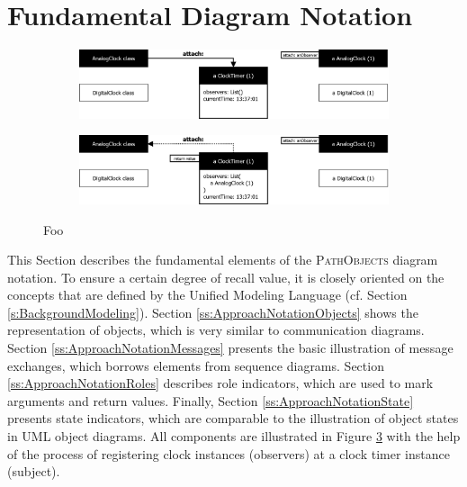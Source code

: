 \section{Fundamental Diagram Notation}
\label{s:ApproachNotation}

\begin{figure}[tb]
	\centering
	
	\begin{subfigure}[b]{1.0\textwidth}
		\centering
        \includegraphics[width=\textwidth]{../images/03-PathObjects-Before}
        \caption[Foo]{}
		\label{fig:ApproachBasicBefore}
	\end{subfigure}
	
	\vspace{1.0cm}
	
	\begin{subfigure}[b]{1.0\textwidth}
		\centering
		\includegraphics[width=\textwidth]{../images/03-PathObjects-After}
		\caption[Foo]{}
		\label{fig:ApproachBasicAfter}
	\end{subfigure}
	
	\caption[Foo]{Foo}
	\label{fig:ApproachBasic}
\end{figure}

This Section describes the fundamental elements of the \textsc{PathObjects} diagram notation.
To ensure a certain degree of recall value, it is closely oriented on the concepts that are defined by the Unified Modeling Language (cf. Section \ref{s:BackgroundModeling}).
Section \ref{ss:ApproachNotationObjects} shows the representation of objects, which is very similar to communication diagrams.
Section \ref{ss:ApproachNotationMessages} presents the basic illustration of message exchanges, which borrows elements from sequence diagrams.
Section \ref{ss:ApproachNotationRoles} describes role indicators, which are used to mark arguments and return values. 
Finally, Section \ref{ss:ApproachNotationState} presents state indicators, which are comparable to the illustration of object states in UML object diagrams.
All components are illustrated in Figure \ref{fig:ApproachBasic} with the help of the process of registering clock instances (observers) at a clock timer instance (subject).

